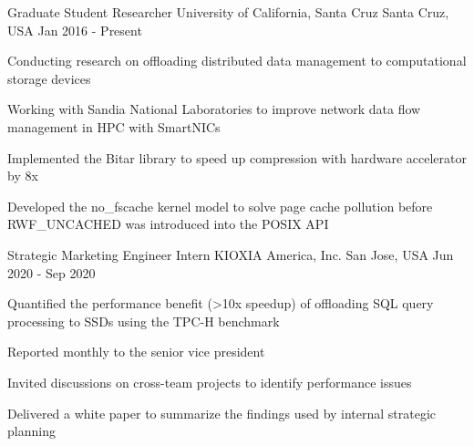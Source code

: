 

\begin{cventries}

  \cventry
    {Graduate Student Researcher} %
    {University of California, Santa Cruz} %
    {Santa Cruz, USA} %
    {Jan 2016 - Present} %
    {
      \begin{cvitems} %
        \item {Conducting research on offloading distributed data management to computational storage devices}
        \item {Working with Sandia National Laboratories to improve network data flow management in HPC with SmartNICs}
        \item {Implemented the Bitar library to speed up compression with hardware accelerator by 8x}
        \item {Developed the no\_fscache kernel model to solve page cache pollution before RWF\_UNCACHED was introduced into the POSIX API}
      \end{cvitems}
    }

  \cventry
    {Strategic Marketing Engineer Intern} %
    {KIOXIA America, Inc.} %
    {San Jose, USA} %
    {Jun 2020 - Sep 2020} %
    {
      \begin{cvitems} %
        \item {Quantified the performance benefit (\textgreater 10x speedup) of offloading SQL query processing to SSDs using the TPC-H benchmark}
        \item {Reported monthly to the senior vice president}
        \item {Invited discussions on cross-team projects to identify performance issues}
        \item {Delivered a white paper to summarize the findings used by internal strategic planning}
      \end{cvitems}
    }


\end{cventries}
